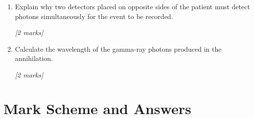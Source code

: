 \begin{tcolorbox}[colback=white, colframe=midblue, breakable]
\begin{enumerate}[label=(\alph*)]
  \item \begin{minipage}[t]{\linewidth}
  Explain why two detectors placed on opposite sides of the patient must detect photons simultaneously for the event to be recorded.
  \par\hfill\textit{[2 marks]}
  \vspace{3.0cm}
  \end{minipage}

  \item \begin{minipage}[t]{\linewidth}
  Calculate the wavelength of the gamma-ray photons produced in the annihilation.
  \par\hfill\textit{[2 marks]}
  \vspace{3.0cm}
  \end{minipage}
\end{enumerate}

\end{tcolorbox}

\section{Mark Scheme and Answers}

